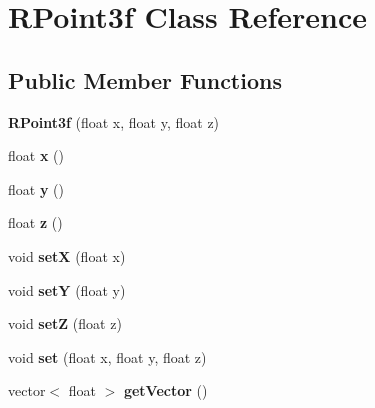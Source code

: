 \hypertarget{classRPoint3f}{
\section{RPoint3f Class Reference}
\label{classRPoint3f}
}
\subsection*{Public Member Functions}
\begin{DoxyCompactItemize}
\item 
\hypertarget{classRPoint3f_a31a47d79675ee201428f46e5c2ee1dc2}{
{\bfseries RPoint3f} (float x, float y, float z)}
\label{classRPoint3f_a31a47d79675ee201428f46e5c2ee1dc2}

\item 
\hypertarget{classRPoint3f_adbf9bc217d5d17197082cde3e5a8515a}{
float {\bfseries x} ()}
\label{classRPoint3f_adbf9bc217d5d17197082cde3e5a8515a}

\item 
\hypertarget{classRPoint3f_a4c5630e38f3313b8065375a0760be67b}{
float {\bfseries y} ()}
\label{classRPoint3f_a4c5630e38f3313b8065375a0760be67b}

\item 
\hypertarget{classRPoint3f_a89a8e4994236fd856bed8155ff694b89}{
float {\bfseries z} ()}
\label{classRPoint3f_a89a8e4994236fd856bed8155ff694b89}

\item 
\hypertarget{classRPoint3f_a87d08a6b3fb874eedb2a98782196bce9}{
void {\bfseries setX} (float x)}
\label{classRPoint3f_a87d08a6b3fb874eedb2a98782196bce9}

\item 
\hypertarget{classRPoint3f_a6fc795464d934d0a05b51c803893bb17}{
void {\bfseries setY} (float y)}
\label{classRPoint3f_a6fc795464d934d0a05b51c803893bb17}

\item 
\hypertarget{classRPoint3f_a8c09b32691638dd2b0fb80c4439f2fbb}{
void {\bfseries setZ} (float z)}
\label{classRPoint3f_a8c09b32691638dd2b0fb80c4439f2fbb}

\item 
\hypertarget{classRPoint3f_a539e6a17e802c3223034619cf2a7a366}{
void {\bfseries set} (float x, float y, float z)}
\label{classRPoint3f_a539e6a17e802c3223034619cf2a7a366}

\item 
\hypertarget{classRPoint3f_a1d650d3290d84cc525c2727f84a41df4}{
vector$<$ float $>$ {\bfseries getVector} ()}
\label{classRPoint3f_a1d650d3290d84cc525c2727f84a41df4}


\end{DoxyCompactItemize}
